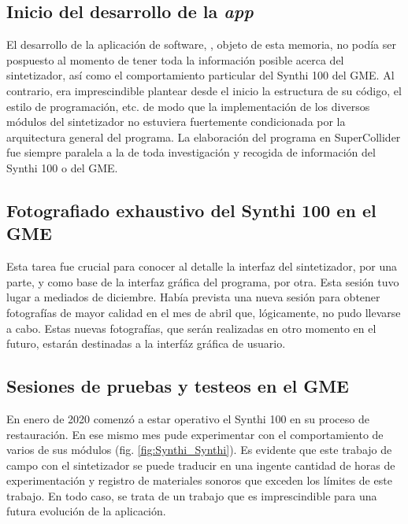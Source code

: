\subsection{Inicio del desarrollo de la \textit{app}}

El desarrollo de la aplicación de software, \appName, objeto de esta memoria, no podía ser pospuesto al momento de tener toda la información posible acerca del sintetizador, así como el comportamiento particular del Synthi 100 del GME. Al contrario, era imprescindible plantear desde el inicio la estructura de su código, el estilo de programación, etc. de modo que la implementación de los diversos módulos del sintetizador no estuviera fuertemente condicionada por la arquitectura general del programa. La elaboración del programa en SuperCollider fue siempre paralela a la de toda investigación y recogida de información del Synthi 100 o del GME.

\subsection{Fotografiado exhaustivo del Synthi 100 en el GME}

Esta tarea fue crucial para conocer al detalle la interfaz del sintetizador, por una parte, y como base de la interfaz gráfica del programa, por otra. Esta sesión tuvo lugar a mediados de diciembre. Había prevista una nueva sesión para obtener fotografías de mayor calidad en el mes de abril que, lógicamente, no pudo llevarse a cabo. Estas nuevas fotografías, que serán realizadas en otro momento en el futuro, estarán destinadas a la interfáz gráfica de usuario.

\subsection{Sesiones de pruebas y testeos en el GME}

En enero de 2020 comenzó a estar operativo el Synthi 100 en su proceso de restauración. En ese mismo mes pude experimentar con el comportamiento de varios de sus módulos (fig. \ref{fig:Synthi_Synthi}). Es evidente que este trabajo de campo con el sintetizador se puede traducir en una ingente cantidad de horas de experimentación y registro de materiales sonoros que exceden los límites de este trabajo. En todo caso, se trata de un trabajo que es imprescindible para una futura evolución de la aplicación.

